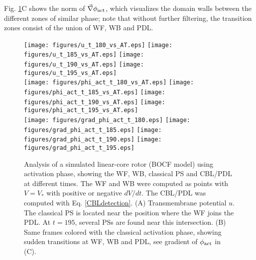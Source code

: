 \documentclass{article}
\newcommand{\phiact}{\ensuremath{\phi_{\rm act}}}
\newcommand{\VS}{V_*}
\begin{document}


Fig. \ref{fig:S1S2revisited}C shows the norm of $\vec \nabla \phiact$, which visualizes the domain walls between the different zones of similar phase; note that without further filtering, the transition zones consist of the union of WF, WB and PDL.  

\begin{figure}
    \centering
    \texttt{[image: figures/u\_t\_180\_vs\_AT.eps]}
    \texttt{[image: figures/u\_t\_185\_vs\_AT.eps]}
    \texttt{[image: figures/u\_t\_190\_vs\_AT.eps]}
    \texttt{[image: figures/u\_t\_195\_vs\_AT.eps]} \\
    
       \texttt{[image: figures/phi\_act\_t\_180\_vs\_AT.eps]}
    \texttt{[image: figures/phi\_act\_t\_185\_vs\_AT.eps]}
    \texttt{[image: figures/phi\_act\_t\_190\_vs\_AT.eps]}
    \texttt{[image: figures/phi\_act\_t\_195\_vs\_AT.eps]} \\
    
    \texttt{[image: figures/grad\_phi\_act\_t\_180.eps]}
    \texttt{[image: figures/grad\_phi\_act\_t\_185.eps]}
    \texttt{[image: figures/grad\_phi\_act\_t\_190.eps]}
    \texttt{[image: figures/grad\_phi\_act\_t\_195.eps]}\\
        \caption{Analysis of a simulated linear-core rotor (BOCF model) using activation phase, showing the WF, WB, classical PS and CBL/PDL at different times. The WF and WB were computed as points with $V=\VS$ with positive or negative $dV/dt$. The CBL/PDL was  computed with Eq. \eqref{CBLdetection}.
        (A) Transmembrane potential $u$. The classical PS is located near the position where the WF joins the PDL. At $t=195$, several PSs are found near this intersection.  
        (B) Same frames colored with the classical activation phase, showing sudden transitions at WF, WB and PDL, see gradient of $\phiact$ in (C). }
    \label{fig:S1S2revisited}
\end{figure}
\end{document}
